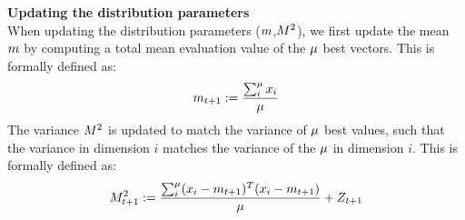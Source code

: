 \textbf{Updating the distribution parameters}\\
When updating the distribution parameters ($m$,$M^2$), we first update
the mean $m$ by computing a total mean evaluation value of the $\mu$ best vectors. This is formally defined as:
\begin{align*}
m_{t +1}:=\frac{\sum_{i}^{\mu} x_{i}}{\mu}
\end{align*}
The variance $M^2$ is updated to match the variance of $\mu$ best
values, such that the variance in dimension $i$ matches the variance of the $\mu$
in dimension $i$.
This is formally defined as:
\begin{align*}
M^2_{t +1}:=\frac{\sum_{i}^{\mu}
(x_{i} - m_{t +1})^T(x_{i} - m_{t +1})}{\mu} + Z_{t + 1}
\end{align*}
\\
